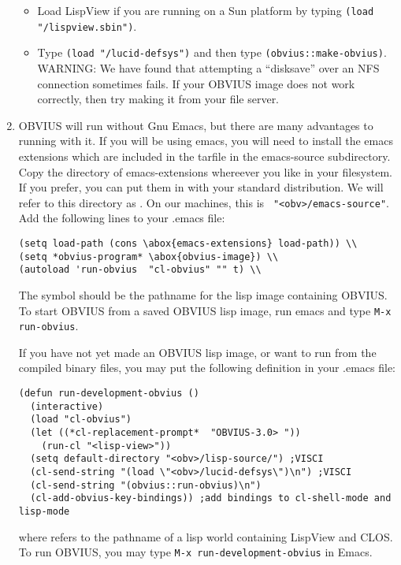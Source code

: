 \begin{enumerate}
\begin{itemize}
\item Load LispView if you are running on a Sun platform by typing
{\tt (load "/lispview.sbin")}.

\item 
Type {\tt (load "/lucid-defsys")} and then
type {\tt (obvius::make-obvius)}.  WARNING: We have found that
attempting a ``disksave'' over an NFS connection sometimes fails.  If
your OBVIUS image does not work correctly, then try making it from
your file server.
\end{itemize}

\item
OBVIUS will run without Gnu Emacs, but there are many advantages to
running with it.  If you will be using emacs, you will need to install
the emacs extensions which are included in the tarfile in the
emacs-source subdirectory.  Copy the directory of emacs-extensions
whereever you like in your filesystem.  If you prefer, you can put
them in with your standard distribution.  We will refer to this
directory as .  On our machines, this is {\tt
"<obv>/emacs-source"}.  Add the following lines to your .emacs file:
\begin{verbatim}
(setq load-path (cons \abox{emacs-extensions} load-path)) \\
(setq *obvius-program* \abox{obvius-image}) \\
(autoload 'run-obvius  "cl-obvius" "" t) \\
\end{verbatim}
The symbol {\tt {}} should be the pathname for the lisp
image containing OBVIUS.  To start OBVIUS from a saved OBVIUS lisp
image, run emacs and type {\tt M-x run-obvius}.

If you have not yet made an OBVIUS lisp image, or want to run from the
compiled binary files, you may put the following definition in your
.emacs file:
\begin{verbatim}
(defun run-development-obvius ()
  (interactive)
  (load "cl-obvius")
  (let ((*cl-replacement-prompt*  "OBVIUS-3.0> "))
    (run-cl "<lisp-view>"))
  (setq default-directory "<obv>/lisp-source/") ;VISCI
  (cl-send-string "(load \"<obv>/lucid-defsys\")\n") ;VISCI
  (cl-send-string "(obvius::run-obvius)\n")
  (cl-add-obvius-key-bindings))	;add bindings to cl-shell-mode and lisp-mode
\end{verbatim}
where {\tt <lisp-view>} refers to the pathname of a lisp world
containing LispView and CLOS.  To run OBVIUS, you may type {\tt M-x
run-development-obvius} in Emacs.


\end{enumerate}
